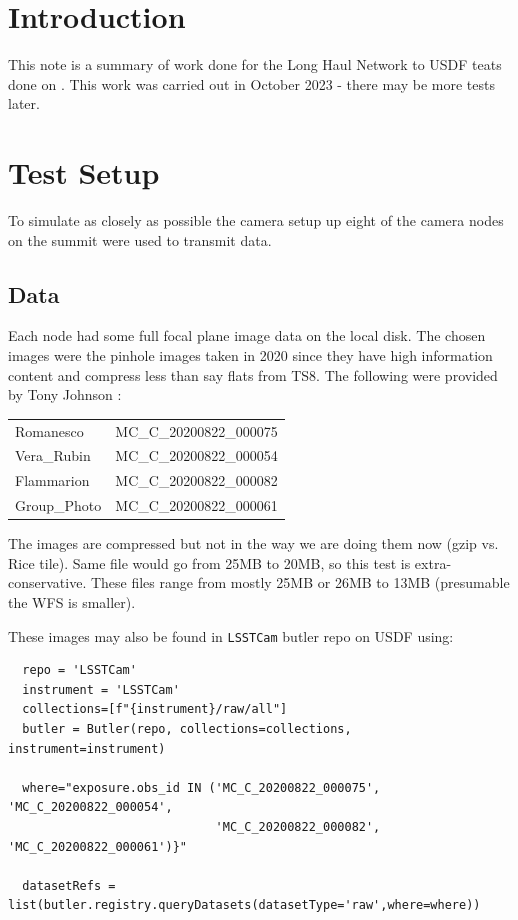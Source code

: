 
\section{Introduction}

This note is a summary of work done for the Long Haul Network to USDF teats done on .
This work was carried out in October 2023 - there may be more tests later.

\section {Test Setup}

To simulate as closely as possible the camera setup up eight of the camera nodes on the summit
were used to transmit data.

\subsection{Data}
Each node had some full focal plane image data on the local disk.
The chosen images were the pinhole images taken in 2020 since they have high information content and compress less than say flats from TS8.
The following  were provided by Tony Johnson :\\
\begin{tabular}{l l}
Romanesco  & MC\_C\_20200822\_000075\\
Vera\_Rubin & MC\_C\_20200822\_000054\\
Flammarion & MC\_C\_20200822\_000082\\
Group\_Photo & MC\_C\_20200822\_000061\\
\end{tabular}

The images are compressed but not in the way we are doing them now (gzip vs. Rice tile).  Same file would go from 25MB to 20MB, so this test is extra-conservative.
These files range from mostly 25MB or 26MB to 13MB (presumable the WFS is smaller).

These images may also be found in {\tt LSSTCam}  butler repo on USDF  using:
\begin{verbatim}
  repo = 'LSSTCam'
  instrument = 'LSSTCam'
  collections=[f"{instrument}/raw/all"]
  butler = Butler(repo, collections=collections, instrument=instrument)

  where="exposure.obs_id IN ('MC_C_20200822_000075', 'MC_C_20200822_000054',
                             'MC_C_20200822_000082', 'MC_C_20200822_000061')}"

  datasetRefs = list(butler.registry.queryDatasets(datasetType='raw',where=where))

\end{verbatim}

